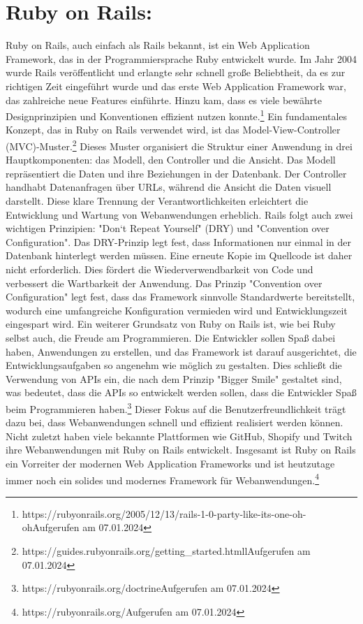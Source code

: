\documentclass{article}
\begin{document}
\section*{Ruby on Rails:}

Ruby on Rails, auch einfach als Rails bekannt, ist ein Web Application Framework, das in der Programmiersprache Ruby entwickelt wurde. Im Jahr 2004 wurde Rails veröffentlicht und erlangte sehr schnell große Beliebtheit, da es zur richtigen Zeit eingeführt wurde und das erste Web Application Framework war, das zahlreiche neue Features einführte. Hinzu kam, dass es viele bewährte Designprinzipien und Konventionen effizient nutzen konnte.\footnote{https://rubyonrails.org/2005/12/13/rails-1-0-party-like-its-one-oh-ohAufgerufen am 07.01.2024}
Ein fundamentales Konzept, das in Ruby on Rails verwendet wird, ist das Model-View-Controller (MVC)-Muster.\footnote{https://guides.rubyonrails.org/getting\_started.htmll\label{rubyr}Aufgerufen am 07.01.2024} Dieses Muster organisiert die Struktur einer Anwendung in drei Hauptkomponenten: das Modell, den Controller und die Ansicht. Das Modell repräsentiert die Daten und ihre Beziehungen in der Datenbank. Der Controller handhabt Datenanfragen über URLs, während die Ansicht die Daten visuell darstellt. Diese klare Trennung der Verantwortlichkeiten erleichtert die Entwicklung und Wartung von Webanwendungen erheblich.
Rails folgt auch zwei wichtigen Prinzipien: "Don`t Repeat Yourself" (DRY) und "Convention over Configuration". Das DRY-Prinzip legt fest, dass Informationen nur einmal in der Datenbank hinterlegt werden müssen. Eine erneute Kopie im Quellcode ist daher nicht erforderlich. Dies fördert die Wiederverwendbarkeit von Code und verbessert die Wartbarkeit der Anwendung. Das Prinzip "Convention over Configuration" legt fest, dass das Framework sinnvolle Standardwerte bereitstellt, wodurch eine umfangreiche Konfiguration vermieden wird und Entwicklungszeit eingespart wird.
Ein weiterer Grundsatz von Ruby on Rails ist, wie bei Ruby selbst auch, die Freude am Programmieren. Die Entwickler sollen Spaß dabei haben, Anwendungen zu erstellen, und das Framework ist darauf ausgerichtet, die Entwicklungsaufgaben so angenehm wie möglich zu gestalten. Dies schließt die Verwendung von APIs ein, die nach dem Prinzip "Bigger Smile" gestaltet sind, was bedeutet, dass die APIs so entwickelt werden sollen, dass die Entwickler Spaß beim Programmieren haben.\footnote{https://rubyonrails.org/doctrineAufgerufen am 07.01.2024} Dieser Fokus auf die Benutzerfreundlichkeit trägt dazu bei, dass Webanwendungen schnell und effizient realisiert werden können.
Nicht zuletzt haben viele bekannte Plattformen wie GitHub, Shopify und Twitch ihre Webanwendungen mit Ruby on Rails entwickelt. Insgesamt ist Ruby on Rails ein Vorreiter der modernen Web Application Frameworks und ist heutzutage immer noch ein solides und modernes Framework für Webanwendungen.\footnote{https://rubyonrails.org/Aufgerufen am 07.01.2024}
\end{document}
